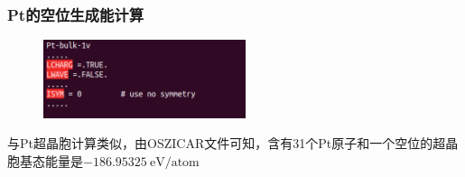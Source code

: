 \frame
{
	\frametitle{\textrm{Pt}的空位生成能计算}
\begin{figure}[h!]
\centering
\includegraphics[height=0.9in,viewport=0 15 370 180,clip]{Figures/Pt_vacancy-INCAR.png}
\caption{\fontsize{6.2pt}{5.2pt}}%
\label{Pt_Bulk-INCAR-modified}
\end{figure}
与\textrm{Pt}超晶胞计算类似，由\textrm{OSZICAR}文件可知，含有31个\textrm{Pt}原子和一个空位的超晶胞基态能量是$-186.95325\mathrm{~eV/atom}$
}

